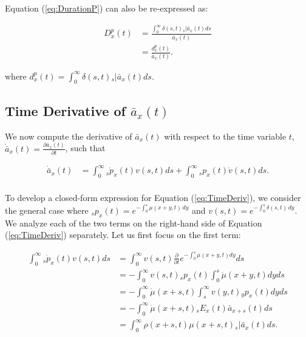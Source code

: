 \documentclass[12pt]{article}
\begin{document}
{Equation (\ref{eq:DurationP}) can also be re-expressed as:

\begin{equation}\label{eq:DurationP2}
\begin{split}
{D}^{p}_{x}(t) &= \frac{\int_0^\infty \delta(s,t) {}_s|\bar{a}_x(t)ds} {\bar{a}_x(t)} \\
                 &= \frac{{d}^{p}_{x}(t)}{\bar{a}_x(t)}.
\end{split}
\end{equation}


where ${d}^{p}_{x}(t)=\int_0^\infty \delta(s,t) {}_s|\bar{a}_x(t) ds$. 

\subsection{Time Derivative of $\bar{a}_x(t)$} \label{sec:timderiv}

We now compute the derivative of $\bar{a}_x(t)$ with respect to the time variable $t$, $\dot{\bar{a}} _x(t)=\frac{\partial \bar{a}_x(t)}{\partial t}$, such that

\begin{equation}\label{eq:TimeDeriv}
\begin{split}
\dot{\bar{a}} _x(t) &= \int_0^\infty {}_s\dot{p}_x(t) v(s,t)ds +\int_0^\infty {}_sp_x(t) \dot{v}(s,t)ds.\\
\end{split}
\end{equation}


To develop a closed-form expression for Equation (\ref{eq:TimeDeriv}), we consider the general case where $_s p_x(t) = e^{-\int_{0}^{s} \mu(x+y,t) \, dy}$ and ${v}(s,t) = e^{-\int_{0}^{s} \delta(s,t) \, dy}$. We analyze each of the two terms on the right-hand side of Equation (\ref{eq:TimeDeriv}) separately. Let us first focus on the first term:


\begin{equation}\label{eq:TimeDerivP1}
\begin{split}
\int_0^\infty {}_s\dot{p}_x(t) v(s,t)ds &= \int_0^\infty   v(s,t) \frac{\partial  }{\partial t}e^{-\int_0^{s}{\mu}(x+y,t)dy}ds\\
&= -\int_0^\infty   v(s,t) {}_sp_x(t)\int_0^{s}\dot{\mu}(x+y,t)dyds\\
&= -\int_0^\infty  \dot{\mu}(x+s,t) \int_s^{\infty} v(y,t) {}_yp_x(t) dyds\\
&= - \int_0^\infty \dot{\mu}(x+s,t)   {}_sE_x(t) \bar{a} _{x+s}(t) ds\\
&= \int_0^\infty \rho(x+s,t) \mu(x+s,t)   {}_s|\bar{a}_x(t) ds.\\
\end{split}
\end{equation}


}
\end{document}
